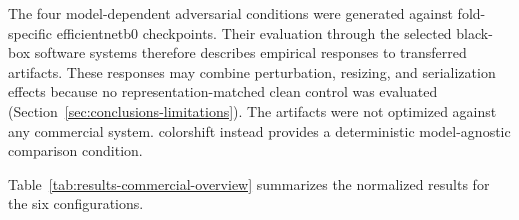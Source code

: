The four model-dependent adversarial conditions were generated against
fold-specific \gls{efficientnetb0} checkpoints. Their evaluation through the
selected black-box software systems therefore describes empirical responses
to transferred artifacts. These responses may combine perturbation, resizing,
and serialization effects because no representation-matched clean control
was evaluated (Section~\ref{sec:conclusions-limitations}). The artifacts were
not optimized against any commercial system. \gls{colorshift} instead
provides a deterministic model-agnostic comparison condition.

Table~\ref{tab:results-commercial-overview} summarizes the normalized results
for the six configurations.

\begin{table}[H]
\centering
\scriptsize
\renewcommand{\arraystretch}{1.15}
\setlength{\tabcolsep}{2.6pt}
\caption{Bundle-weighted summary of the selected black-box software
configurations}
\label{tab:results-commercial-overview}
\end{table}
